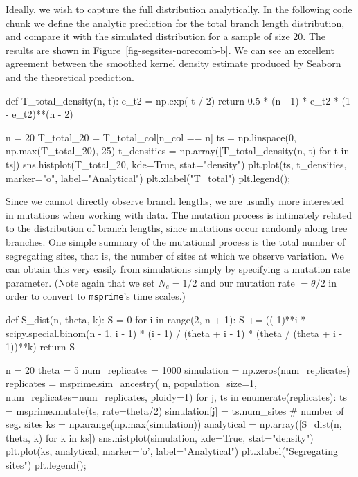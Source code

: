 \documentclass[graybox]{svmult}
\newcommand{\msprime}[0]{\texttt{msprime}}
\begin{document}
    Ideally, we wish to capture the full distribution analytically. In the following code chunk we define the analytic
prediction for the total branch length distribution, and compare it with the simulated distribution for a sample of size 20. The results are shown in
Figure~\ref{fig-segsites-norecomb-b}. We can see an excellent agreement between
the smoothed kernel
density estimate produced by Seaborn and the theoretical prediction.

\begin{pythoncode}
def T_total_density(n, t):
    e_t2 = np.exp(-t / 2)
    return 0.5 * (n - 1) * e_t2 * (1 - e_t2)**(n - 2)

n = 20
T_total_20 = T_total_col[n_col == n]
ts = np.linspace(0, np.max(T_total_20), 25)
t_densities = np.array([T_total_density(n, t) for t in ts])
sns.histplot(T_total_20, kde=True,
    stat="density")
plt.plot(ts, t_densities, marker="o", label="Analytical")
plt.xlabel("T_total")
plt.legend();
\end{pythoncode}

Since we cannot directly observe branch lengths, we are usually more
interested in mutations when working with data. The mutation process is
intimately related to the distribution of branch lengths, since
mutations occur randomly along tree branches. One simple summary of the
mutational process is the total number of segregating sites, that is, the number of
sites at which we observe variation. We can obtain this very
easily from simulations simply by specifying a mutation rate parameter.
(Note again that we set \(N_e=1/2\) and our mutation rate
\(= \theta / 2\) in order to convert to \msprime's time scales.)

\begin{pythoncode}
def S_dist(n, theta, k):
    S = 0
    for i in range(2, n + 1):
        S += ((-1)**i * scipy.special.binom(n - 1, i - 1)
              * (i - 1) / (theta + i - 1)
              * (theta / (theta + i - 1))**k)
    return S

n = 20
theta = 5
num_replicates = 1000
simulation = np.zeros(num_replicates)
replicates = msprime.sim_ancestry(
    n, population_size=1, num_replicates=num_replicates, ploidy=1)
for j, ts in enumerate(replicates):
    ts = msprime.mutate(ts, rate=theta/2)
    simulation[j] = ts.num_sites  # number of seg. sites
ks = np.arange(np.max(simulation))
analytical = np.array([S_dist(n, theta, k) for k in ks])
sns.histplot(simulation, kde=True,
    stat="density")
plt.plot(ks, analytical, marker='o', label="Analytical")
plt.xlabel("Segregating sites")
plt.legend();
\end{pythoncode}
\end{document}
